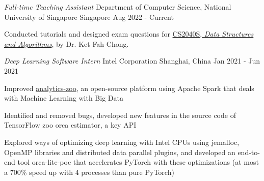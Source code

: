 

\begin{cventries}

\cventry
    {\it Full-time Teaching Assistant} %
    {Department of Computer Science, National University of Singapore} %
    {Singapore} %
    {Aug 2022 - Current} %
    {
      \begin{cvitems} %
        \item {Conducted tutorials and designed exam questions for \href{https://github.com/GZHoffie/CS2040S-tutorials}{CS2040S, \textit{Data Structures and Algorithms}}, by Dr. Ket Fah Chong.}
      \end{cvitems}
    }

    
  \cventry
    {\it Deep Learning Software Intern} %
    {Intel Corporation} %
    {Shanghai, China} %
    {Jan 2021 - Jun 2021} %
    {
      \begin{cvitems} %
        \item Improved \href{https://github.com/intel-analytics/analytics-zoo}{analytics-zoo}, an open-source platform using Apache Spark that deals with Machine Learning with Big Data
        \item Identified and removed bugs, developed new features in the source code of TensorFlow zoo orca estimator, a key API
        \item Explored ways of optimizing deep learning with Intel CPUs using jemalloc, OpenMP libraries and distributed data parallel plugins, and developed an end-to-end tool orca-lite-poc that accelerates PyTorch with these optimizations (at most a 700\% speed up with 4 processes than pure PyTorch)
      \end{cvitems}
    }

\end{cventries}
